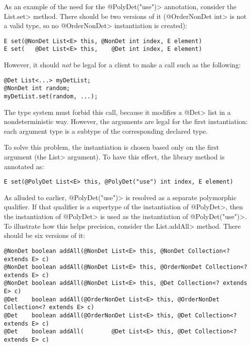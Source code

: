 As an example of the need for the \<@PolyDet("use")> annotation, consider the
\<List.set> method.  There should be two versions of it (\<@OrderNonDet
int> is not a valid type, so no \<@OrderNonDet> instantiation is created):

\begin{Verbatim}
E set(@NonDet List<E> this, @NonDet int index, E element)
E set(   @Det List<E> this,    @Det int index, E element)
\end{Verbatim}

\noindent
However, it should \emph{not} be legal for a client to make a call such as
the following:

\begin{Verbatim}
@Det List<...> myDetList;
@NonDet int random;
myDetList.set(random, ...);
\end{Verbatim}

\noindent
The type system must forbid this call, because it modifies a
\<@Det> list in a nondeterministic way.
However, the arguments are legal for the first instantiation:
each argument type is a subtype of the corresponding declared type.

To solve this problem, the instantiation is chosen based only on the first
argument (the \<List> argument).  To have this effect, the library method
is annotated as:

\begin{Verbatim}
E set(@PolyDet List<E> this, @PolyDet("use") int index, E element)
\end{Verbatim}

As alluded to earlier, \<@PolyDet("use")> is resolved as a
separate polymorphic qualifier. If that qualifier is a supertype
of the instantiation of \<@PolyDet>, then the instantiation of \<@PolyDet>
is used as the instantiation of \<@PolyDet("use")>.
To illustrate how this helps precision,
consider the \<List.addAll> method. There should be six versions of it:

\begin{Verbatim}
@NonDet boolean addAll(@NonDet List<E> this, @NonDet Collection<? extends E> c)
@NonDet boolean addAll(@NonDet List<E> this, @OrderNonDet Collection<? extends E> c)
@NonDet boolean addAll(@NonDet List<E> this, @Det Collection<? extends E> c)
@Det    boolean addAll(@OrderNonDet List<E> this, @OrderNonDet Collection<? extends E> c)
@Det    boolean addAll(@OrderNonDet List<E> this, @Det Collection<? extends E> c)
@Det    boolean addAll(        @Det List<E> this, @Det Collection<? extends E> c)
\end{Verbatim}


